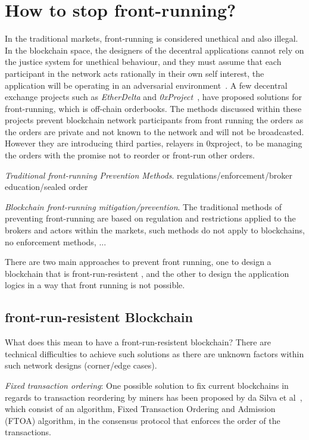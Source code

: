 



\section{How to stop front-running?}
In the traditional markets, front-running is considered unethical and also illegal. In the blockchain space, the designers of the decentral applications cannot rely on the justice system for unethical behaviour, and they must assume that each participant in the network acts rationally in their own self interest, the application will be operating in an adversarial environment~\cite{0xfrontrunning:online}.
A few decentral exchange projects such as \textit{EtherDelta} and \textit{0xProject}~\cite{warren20170x}, have proposed solutions for front-running, which is off-chain orderbooks. The methods discussed within these projects prevent blockchain network participants from front running the orders as the orders are private and not known to the network and will not be broadcasted. However they are introducing third parties, \eg relayers in 0xproject, to be managing the orders with the promise not to reorder or front-run other orders. 

\emph{Traditional front-running Prevention Methods}. regulations/enforcement/broker education/sealed order


\emph{Blockchain front-running mitigation/prevention}. The traditional methods of preventing front-running are based on regulation and restrictions applied to the brokers and actors within the markets, such methods do not apply to blockchains, no enforcement methods, ... 

There are two main approaches to prevent front running, one to design a blockchain that is front-run-resistent , and the other to design the application logics in a way that front running is not possible. 


\subsection{front-run-resistent Blockchain}
What does this mean to have a front-run-resistent blockchain?  There are technical difficulties to achieve such solutions as there are unknown factors within such network designs (corner/edge cases).

\emph{Fixed transaction ordering}: One possible solution to fix current blockchains in regards to transaction reordering by miners has been proposed by da Silva et al~\cite{fixedordering2018silva}, which consist of an algorithm, Fixed Transaction Ordering and Admission (FTOA) algorithm, in the consensus protocol that enforces the order of the transactions. 


